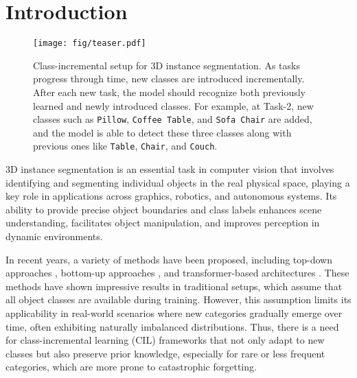 \section{Introduction}
\label{sec:intro}

\begin{figure*}[!htb]
  \centering
  \texttt{[image: fig/teaser.pdf]}
  \caption{Class-incremental setup for 3D instance segmentation. As tasks progress through time, new classes are introduced incrementally. After each new task, the model should recognize both previously learned and newly introduced classes. For example, at Task-2, new classes such as \texttt{Pillow}, \texttt{Coffee Table}, and \texttt{Sofa Chair} are added, and the model is able to detect these three classes along with previous ones like \texttt{Table}, \texttt{Chair}, and \texttt{Couch}.}
  \label{fig:cl_setup}
\end{figure*}

3D instance segmentation is an essential task in computer vision that involves identifying and segmenting individual objects in the real physical space, playing a key role in applications across graphics, robotics, and autonomous systems. Its ability to provide precise object boundaries and class labels enhances scene understanding, facilitates object manipulation, and improves perception in dynamic environments.

In recent years, a variety of methods have been proposed, including top-down approaches \cite{wang2018sgpn, jia2021scaling, zhang2021point}, bottom-up approaches \cite{hou20193dsis, yang2019learning}, and transformer-based architectures \cite{Schult23ICRA}. These methods have shown impressive results in traditional setups, which assume that all object classes are available during training. However, this assumption limits its applicability in real-world scenarios where new categories gradually emerge over time, often exhibiting naturally imbalanced distributions. Thus, there is a need for class-incremental learning (CIL) frameworks that not only adapt to new classes but also preserve prior knowledge, especially for rare or less frequent categories, which are more prone to catastrophic forgetting.

